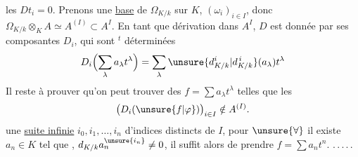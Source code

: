 
les $Dt_i=0$.  Prenons une
\uline{base} de $\Omega_{K/k}$ sur $K$,  $(\omega_i)_{i\in I}$,
donc $\Omega_{K/k}\otimes_K A\simeq A^{(I)}\subset A^I$. En tant
que dérivation dans $A^I$, $D$ est donnée
par ses composantes $D_i$, qui sont
$^t$ déterminées
\[
D_i\Bigl(\sum_\lambda a_\lambda t^\lambda\Bigr)
=\sum_\lambda \unsure{d^i_{K/k}|d_{K/k}^{\,i}}(a_\lambda)t^\lambda
\]
Il reste à prouver qu'on peut trouver
des $f=\sum a_\lambda t^\lambda$ telles que les
\[
\bigl(D_i(\unsure{f|\varphi})\bigr)_{i\in I}\notin A^{(I)}.
\]
une \uline{suite infinie} $i_0,i_1,\ldots,i_n$
d'indices distincts de $I$,  pour $\unsure{\forall}$
 il existe $a_n\in K$ tel que
,
$d_{K/k}a_n^{\unsure{i_n}}\ne0$, il suffit alors de
prendre $f=\sum a_nt^n$. .\,.\,.\,.\,.

